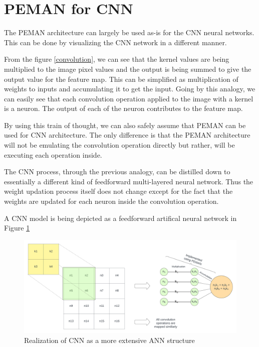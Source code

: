 \section{PEMAN for CNN}

The PEMAN architecture can largely be used as-is for the CNN neural networks. This can be done by visualizing the CNN network in a different manner.

From the figure \ref{convolution}, we can see that the kernel values are being multiplied to the image pixel values and the output is being summed to give the output value for the feature map. This can be simplified as multiplication of weights to inputs and accumulating it to get the input. Going by this analogy, we can easily see that each convolution operation applied to the image with a kernel is a neuron. The output of each of the neuron contributes to the feature map.

By using this train of thought, we can also safely assume that PEMAN can be used for CNN architecture. The only difference is that the PEMAN architecture will not be emulating the convolution operation directly but rather, will be executing each operation inside.

The CNN process, through the previous analogy, can be distilled down to essentially a different kind of feedforward multi-layered neural network. Thus the weight updation process itself does not change except for the fact that the weights are updated for each neuron inside the convolution operation.

A CNN model is being depicted as a feedforward artifical neural network in Figure \ref{cnn_as_ann}

\begin{figure}
	\centering
	\includegraphics[width=\textwidth]{images/cnn_as_ann3.png}
	\caption{Realization of CNN as a more extensive ANN structure}
	\label{cnn_as_ann}
\end{figure}


